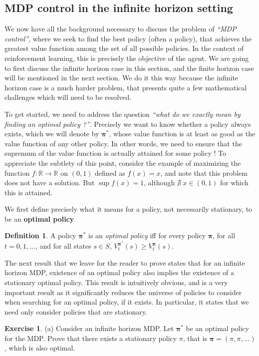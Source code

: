 \documentclass{article}
\theoremstyle{definition}
\newtheorem{exercise}{Exercise}[section]
\newtheorem{definition}{Definition}[section]
\theoremstyle{remark}
\begin{document}
\subsection{MDP control in the infinite horizon setting}
We now have all the background necessary to discuss the problem of \textit{``MDP control''}, where we seek to find the best policy (often a policy), that achieves the greatest value function among the set of all possible policies. In the context of reinforcement learning, this is precisely the objective of the agent. We are going to first discuss the infinite horizon case in this section, and the finite horizon case will be mentioned in the next section. We do it this way because the infinite horizon case is a much harder problem, that presents quite a few mathematical challenges which will need to be resolved.

To get started, we need to address the question \textit{``what do we exactly mean by finding an optimal policy ?''}.  Precisely we want to know whether a policy always exists, which we will denote by $\bm{\pi}^{\ast}$, whose value function is at least as good as the value function of any other policy. In other words, we need to ensure that the supremum of the value function is actually attained for some policy ! To appreciate the subtlety of this point, consider the example of maximizing the function $f : \mathbb{R} \rightarrow \mathbb{R}$ on $(0,1)$ defined as $f(x) = x$, and note that this problem does not have a solution. But $\sup f(x) = 1$, although $\nexists \; x \in (0,1)$ for which this is attained. 

We first define precisely what it means for a policy, not necessarily stationary, to be an \textbf{optimal policy}.
\begin{definition}
A policy $\bm{\pi}^{\ast}$ is an \textit{optimal policy} iff for every policy $\bm{\pi}$, for all $t = 0,1,\dots$, and for all states $s \in S$, $V^{\bm{\pi}^{\ast}}_t(s) \geq V^{\bm{\pi}}_t(s)$. 
\label{eq:opt-policy-def}
\end{definition}

The next result that we leave for the reader to prove states that for an infinite horizon MDP, existence of an optimal policy also implies the existence of a stationary optimal policy. This result is intuitively obvious, and is a very important result as it significantly reduces the universe of policies to consider when searching for an optimal policy, if it exists. In particular, it states that we need only consider policies that are stationary.
\begin{exercise}
(a) Consider an infinite horizon MDP. Let $\bm{\pi}^{\ast}$ be an optimal policy for the MDP. Prove that there exists a stationary policy $\pi$, that is $\bm{\pi} = (\pi,\pi,\dots)$, which is also optimal.
\label{ex-MDP-stationary-policy-opt}
\end{exercise}
\end{document}
